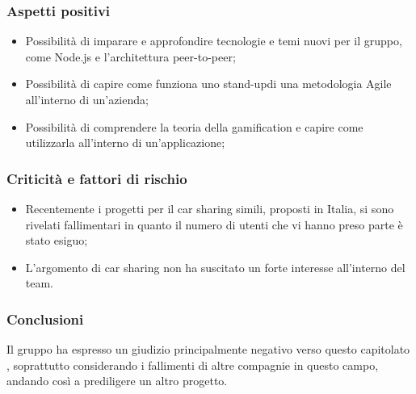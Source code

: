 \subsubsection{Aspetti positivi}
\begin{itemize}
	\item Possibilità di imparare e approfondire tecnologie e temi nuovi per il 
gruppo, come Node.js\glo{} e l'architettura peer-to-peer\glo{};
	\item Possibilità di capire come funziona uno stand-up\glosp di una metodologia Agile\glosp 
all'interno di un'azienda;
	\item Possibilità di comprendere la teoria della gamification\glo{} e capire come 
utilizzarla all'interno di un'applicazione;
\end{itemize}

\subsubsection{Criticità e fattori di rischio}
\begin{itemize}
	\item Recentemente i progetti per il car sharing simili, proposti in Italia, si 
sono rivelati fallimentari in quanto il numero di utenti che vi hanno preso 
parte è stato esiguo;

	\item L'argomento di car sharing non ha suscitato un forte interesse 
all'interno del team.
\end{itemize}
\subsubsection{Conclusioni}
Il gruppo ha espresso un giudizio principalmente negativo verso questo capitolato \glo,
soprattutto considerando i fallimenti di altre compagnie in questo campo, 
andando così a prediligere un altro progetto.

